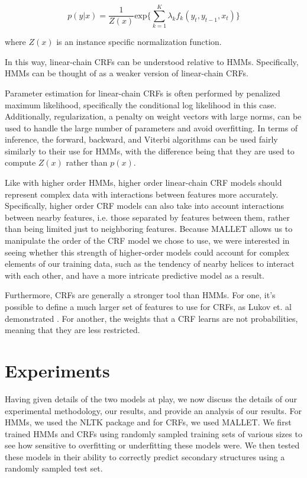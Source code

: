 \documentclass[11 pt, twocolumn]{article}
\begin{document}
$$p(y|x) = \frac{1}{Z(x)}\text{exp}\{\sum_{k=1}^{K}\lambda_k f_k (y_t, y_{t-1}, x_t)\}$$

where $Z(x)$ is an instance specific  normalization function.

In this way, linear-chain CRFs can be understood relative to HMMs\cite{Sutton}. Specifically,  HMMs can be thought of as a weaker version of linear-chain CRFs. 

Parameter estimation for linear-chain CRFs is often performed by penalized maximum likelihood, specifically the conditional log likelihood in this case. Additionally, regularization, a penalty on weight vectors with large norms, can be used to handle the large number of parameters and avoid overfitting. In terms of inference, the forward, backward, and Viterbi algorithms can be used fairly similarly to their use for HMMs, with the difference being that they are used to compute $Z(x)$ rather than $p(x)$.

Like with higher order HMMs, higher order linear-chain CRF models should represent complex data with interactions between features more accurately. Specifically, higher order CRF models can also take into account interactions between nearby features, i.e. those separated by features between them, rather than being limited just to neighboring features. Because MALLET allows us to manipulate the order of the CRF model we chose to use, we were interested in seeing whether this strength of higher-order models could account for complex elements of our training data, such as the tendency of nearby helices to interact with each other, and have a more intricate predictive model as a result.

Furthermore, CRFs are generally a stronger tool than HMMs. For one, it's possible to define a much larger set of features to use for CRFs, as  Lukov et. al demonstrated \cite{Lukov}. For another, the weights that a CRF learns are not probabilities, meaning that they are less restricted.

\section{Experiments}

Having given details of the two models at play, we now discuss the details of our experimental methodology, our results, and provide an analysis of our results. For HMMs, we used the NLTK package and for CRFs, we used MALLET. We first trained HMMs and CRFs using randomly sampled training sets of various sizes to see how sensitive to overfitting or underfitting these models were. We then tested these models in their ability to correctly predict secondary structures using a randomly sampled test set. 
\end{document}
